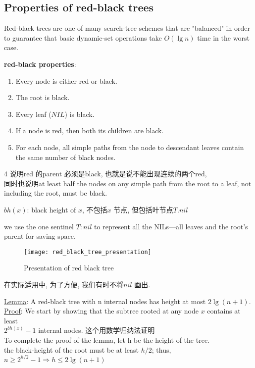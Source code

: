 \documentclass{article}
\begin{document}
\subsection{Properties of red-black trees}
Red-black trees are one of many search-tree schemes that are "balanced" in order to guarantee that basic dynamic-set operations take $O(\lg n)$ time in the worst case.

\textbf{red-black properties}:
\begin{enumerate}
\item Every node is either red or black.
\item The root is black.
\item Every leaf ($NIL$) is black.
\item If a node is red, then both its children are black.
\item For each node, all simple paths from the node to descendant leaves contain the same number of black nodes.
\end{enumerate}

4 说明red 的parent 必须是black, 也就是说不能出现连续的两个red,\\
同时也说明at least half the nodes on any simple path from the root to a leaf, not including the root, must be black.

$bh(x)$: black height of $x$, 不包括$x$ 节点, 但包括叶节点$T.nil$

we use the one sentinel $T:nil$ to represent all the NILs—all leaves and the root's parent for saving space.
\begin{figure}[htbp]
  \centering
  \texttt{[image: red\_black\_tree\_presentation]}\\
  \caption{Presentation of red black tree}\label{fig.rbt.presentation}
\end{figure}

在实际适用中, 为了方便, 我们有时不将$nil$ 画出.

\noindent \underline{Lemma}: A red-black tree with n internal nodes has height at most $2\lg(n+1)$.\\
\underline{Proof}: We start by showing that the subtree rooted at any node $x$ contains at least\\
$2^{bh(x)} - 1$ internal nodes. 这个用数学归纳法证明\\
To complete the proof of the lemma, let h be the height of the tree.\\
the black-height of the root must be at least $h/2$; thus,\\
$n \geq 2^{h/2} - 1 \Rightarrow h \leq 2 \lg(n+1)$\\
\end{document}

